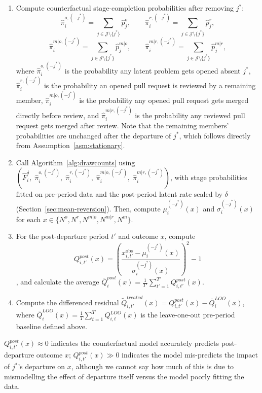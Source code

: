 \documentclass[source/paper/main.tex]{subfiles}
\begin{document}
\begin{enumerate}
    \item Compute counterfactual stage-completion probabilities after removing $j^*$:
    $$\hat{\pi}_i^{o,(-j^*)} = \sum_{j\in\mathcal J\setminus\{j^*\}}\hat{p}_j^o, \qquad \hat{\pi}_i^{r,(-j^*)} = \sum_{j\in\mathcal J\setminus\{j^*\}}\hat{p}_j^r,$$
    $$\hat{\pi}_i^{m|o,(-j^*)} = \sum_{j\in\mathcal J\setminus\{j^*\}}\hat{p}_j^{m|o}, \qquad \hat{\pi}_i^{m|r,(-j^*)} = \sum_{j\in\mathcal J\setminus\{j^*\}}\hat{p}_j^{m|r},$$
    where $\hat{\pi}_i^{o,(-j^*)}$ is the probability any latent problem gets opened absent $j^*$, $\hat{\pi}_i^{r,(-j^*)}$ is the probability an opened pull request is reviewed by a remaining member, $\hat{\pi}_i^{m|o,(-j^*)}$ is the probability any opened pull request gets merged directly before review, and $\hat{\pi}_i^{m|r,(-j^*)}$ is the probability any reviewed pull request gets merged after review.
    Note that the remaining members' probabilities are unchanged after the departure of $j^*$, which follows directly from Assumption~\ref{asm:stationary}.
    \item Call Algorithm~\ref{alg:drawcounts} using $(\hat{F}_i^{\delta},\;\hat{\pi}_i^{o,(-j^*)},\;\hat{\pi}_i^{r,(-j^*)},\;\hat{\pi}_i^{m|o,(-j^*)},\;\hat{\pi}_i^{m|r,(-j^*)})$, with stage probabilities fitted on pre-period data and the post-period latent rate scaled by $\delta$ (Section~\ref{sec:mean-reversion}). Then, compute $\mu_i^{(-j^*)}(x)$ and $\sigma_i^{(-j^*)}(x)$ for each $x \in \{N^o, N^r, N^{m|o}, N^{m|r}, N^m\}$.
    \item For the post-departure period $t'$ and outcome $x$, compute
    $$Q_{i,t'}^{post}(x) = \left(\frac{x_{i,t'}^{\mathrm{obs}} - \mu_i^{(-j^*)}(x)}{\sigma_i^{(-j^*)}(x)}\right)^2 - 1$$, and calculate the average $\bar{Q}_i^{post}(x) = \frac{1}{T'}\sum_{t'=1}^{T'} Q_{i,t'}^{post}(x)$.
    \item Compute the differenced residual $\tilde{Q}_{i,t'}^{treated}(x) = Q_{i,t'}^{post}(x) - \bar{Q}_i^{LOO}(x)$, where $\bar{Q}_i^{LOO}(x) = \frac{1}{T}\sum_{t=1}^T Q_{i,t}^{LOO}(x)$ is the leave-one-out pre-period baseline defined above.
\end{enumerate}
$Q_{i,t'}^{post}(x) \approx 0$ indicates the counterfactual model accurately predicts post-departure outcome $x$; $Q_{i,t'}^{post}(x) \gg 0$ indicates the model mis-predicts the impact of $j^*$'s departure on $x$, although we cannot say how much of this is due to mismodelling the effect of departure itself versus the model poorly fitting the data.
\end{document}
